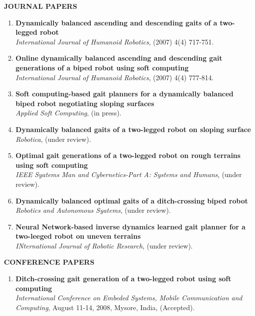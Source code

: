\thispagestyle{empty}
\begin{center}
\vspace*{11pt}
\end{center}
\vspace{0.05in}
{\bf JOURNAL PAPERS}
\begin{enumerate}
\item{{\bf Dynamically balanced ascending and descending gaits of a two-legged robot}}\\
           {\it International Journal of Humanoid Robotics}, (2007) 4(4) 717-751.
\item{{\bf Online dynamically balanced ascending and descending gait generations of a biped robot using soft computing}}\\
           {\it International Journal of Humanoid Robotics}, (2007) 4(4) 777-814.   
\item{{\bf Soft computing-based gait planners for a dynamically balanced biped robot negotiating sloping surfaces}}\\
	   {\it Applied Soft Computing}, (in press).
\item{{\bf Dynamically balanced gaits of a two-legged robot on sloping surface}}\\
	   {\it Robotica}, (under review).
\item{{\bf Optimal gait generations of a two-legged robot on rough terrains using soft computing}}\\
	   {\it IEEE Syatems Man and Cybernetics-Part A: Systems and Humans}, (under review).
\item{{\bf Dynamically balanced optimal gaits of a ditch-crossing biped robot}}\\
	   {\it Robotics and Autonomous Syatems}, (under review).
\item{{\bf Neural Network-based inverse dynamics learned gait planner for a two-leeged robot on uneven terrains}}\\
	   {\it INternational Journal of Robotic Research}, (under review).
\end{enumerate}
\newpage
{\bf CONFERENCE PAPERS}
\begin{enumerate}
\item{{\bf Ditch-crossing gait generation of a two-legged robot using soft computing}}\\
	   {\it International Conference on Embeded Systems, Mobile Communication and Computing}, August 11-14, 2008,  
	   Mysore, India, (Accepted).
\end{enumerate}
\newpage

